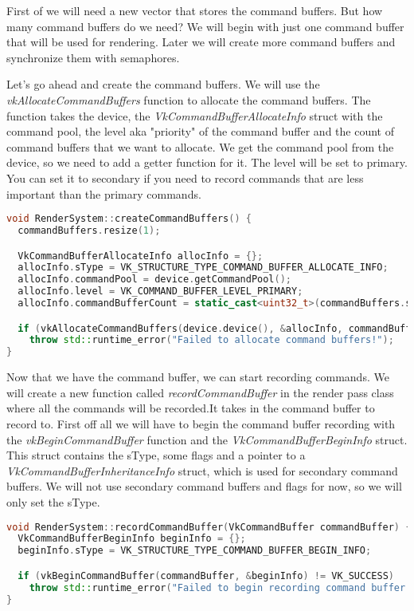 \documentclass[12pt]{report} \usepackage{preamble}
\begin{document}
First of we will need a new vector that stores the command buffers. But how many command buffers do we need? We will begin with
just one command buffer that will be used for rendering. Later we will create more command buffers and synchronize them with
semaphores.

Let's go ahead and create the command buffers. We will use the \textit{vkAllocateCommandBuffers} function to allocate the
command buffers. The function takes the device, the \textit{VkCommandBufferAllocateInfo} struct with the command pool,
the level aka "priority" of the command buffer and the count of command buffers that we want to allocate. We get
the command pool from the device, so we need to add a getter function for it. The level will be set to primary. You can
set it to secondary if you need to record commands that are less important than the primary commands.

\begin{lstlisting}[language=C++]
void RenderSystem::createCommandBuffers() {
  commandBuffers.resize(1);

  VkCommandBufferAllocateInfo allocInfo = {};
  allocInfo.sType = VK_STRUCTURE_TYPE_COMMAND_BUFFER_ALLOCATE_INFO;
  allocInfo.commandPool = device.getCommandPool();
  allocInfo.level = VK_COMMAND_BUFFER_LEVEL_PRIMARY;
  allocInfo.commandBufferCount = static_cast<uint32_t>(commandBuffers.size());

  if (vkAllocateCommandBuffers(device.device(), &allocInfo, commandBuffers.data()) != VK_SUCCESS)
    throw std::runtime_error("Failed to allocate command buffers!");
}
\end{lstlisting}

Now that we have the command buffer, we can start recording commands. We will create a new function called \textit{recordCommandBuffer}
in the render pass class where all the commands will be recorded.It takes in the command buffer to record to.
First off all we will have to begin the command buffer recording
with the \textit{vkBeginCommandBuffer} function and the \textit{VkCommandBufferBeginInfo} struct. This struct contains the sType,
some flags and a pointer to a \textit{VkCommandBufferInheritanceInfo} struct, which is used for secondary command buffers. We will
not use secondary command buffers and flags for now, so we will only set the sType.

\begin{lstlisting}[language=C++]
void RenderSystem::recordCommandBuffer(VkCommandBuffer commandBuffer) {
  VkCommandBufferBeginInfo beginInfo = {};
  beginInfo.sType = VK_STRUCTURE_TYPE_COMMAND_BUFFER_BEGIN_INFO;

  if (vkBeginCommandBuffer(commandBuffer, &beginInfo) != VK_SUCCESS)
    throw std::runtime_error("Failed to begin recording command buffer!");
}
\end{lstlisting}
\end{document}
